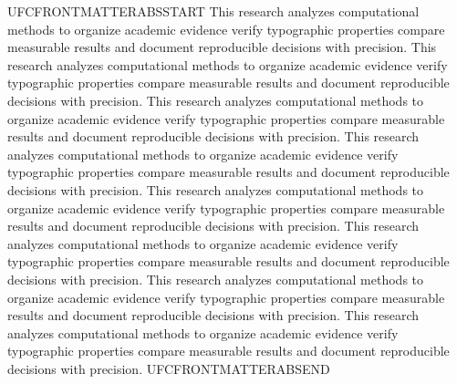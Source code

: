 UFCFRONTMATTERABSSTART This research analyzes computational methods to organize academic evidence verify typographic properties compare measurable results and document reproducible decisions with precision. This research analyzes computational methods to organize academic evidence verify typographic properties compare measurable results and document reproducible decisions with precision. This research analyzes computational methods to organize academic evidence verify typographic properties compare measurable results and document reproducible decisions with precision. This research analyzes computational methods to organize academic evidence verify typographic properties compare measurable results and document reproducible decisions with precision. This research analyzes computational methods to organize academic evidence verify typographic properties compare measurable results and document reproducible decisions with precision. This research analyzes computational methods to organize academic evidence verify typographic properties compare measurable results and document reproducible decisions with precision. This research analyzes computational methods to organize academic evidence verify typographic properties compare measurable results and document reproducible decisions with precision. This research analyzes computational methods to organize academic evidence verify typographic properties compare measurable results and document reproducible decisions with precision. UFCFRONTMATTERABSEND

